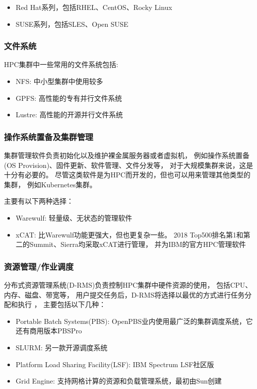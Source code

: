 \begin{itemize}
    \item Red Hat系列，包括RHEL、CentOS、Rocky Linux
    \item SUSE系列，包括SLES、Open SUSE
\end{itemize}

\subsubsection{文件系统}
HPC集群中一些常用的文件系统包括:

\begin{itemize}
    \item NFS: 中小型集群中使用较多
    \item GPFS: 高性能的专有并行文件系统
    \item Lustre: 高性能的开源并行文件系统
\end{itemize}


\subsubsection{操作系统置备及集群管理}
集群管理软件负责初始化以及维护裸金属服务器或者虚拟机，
例如操作系统置备(OS Provision)、固件更新、软件管理、文件分发等，
对于大规模集群来说，这是十分有必要的。
尽管这类软件是为HPC而开发的，但也可以用来管理其他类型的集群，
例如Kubernetes集群。

主要有以下两种选择：

\begin{itemize}
    \item Warewulf: 轻量级、无状态的管理软件
    \item xCAT: 比Warewulf功能更强大，但也更复杂一些。
    2018 Top500排名第1和第二的Summit、Sierra均采取xCAT进行管理，
    并为IBM的官方HPC管理软件
\end{itemize}

\subsubsection{资源管理/作业调度}
分布式资源管理系统(D-RMS)负责控制HPC集群中硬件资源的使用，
包括CPU、内存、磁盘、带宽等，
用户提交任务后，D-RMS将选择以最优的方式进行任务分配和执行
\cite{comparative_drms,hpc_wiki_batch_scheduler}，
主要包括以下几种：

\begin{itemize}
    \item Portable Batch Systems(PBS): OpenPBS业内使用最广泛的集群调度系统，它还有商用版本PBSPro
    \item SLURM: 另一款开源调度系统
    \item Platform Load Sharing Facility(LSF): IBM Spectrum LSF社区版
    \item Grid Engine: 支持网格计算的资源和负载管理系统，最初由Sun创建\cite{wiki_grid_engine}
\end{itemize}

